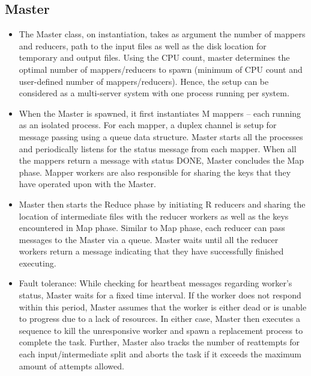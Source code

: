 \documentclass[a4paper,12pt]{article}
\begin{document}
\subsection{Master}

\begin{itemize}
    \item The Master class, on instantiation, takes as argument the number of mappers and reducers, path to the input files as well as the disk location for temporary and output files. Using the CPU count, master determines the optimal number of mappers/reducers to spawn (minimum of CPU count and user-defined number of mappers/reducers). Hence, the setup can be considered as a multi-server system with one process running per system.
    \item When the Master is spawned, it first instantiates M mappers -- each running as an isolated process. For each mapper, a duplex channel is setup for message passing using a queue data structure. Master starts all the processes and periodically listens for the status message from each mapper. When all the mappers return a message with status DONE, Master concludes the Map phase. Mapper workers are also responsible for sharing the keys that they have operated upon with the Master.
    \item Master then starts the Reduce phase by initiating R reducers and sharing the location of intermediate files with the reducer workers as well as the keys encountered in Map phase. Similar to Map phase, each reducer can pass messages to the Master via a queue. Master waits until all the reducer workers return a message indicating that they have successfully finished executing. 
    \item Fault tolerance: While checking for heartbeat messages regarding worker's status, Master waits for a fixed time interval. If the worker does not respond within this period, Master assumes that the worker is either dead or is unable to progress due to a lack of resources. In either case, Master then executes a sequence to kill the unresponsive worker and spawn a replacement process to complete the task. Further, Master also tracks the number of reattempts for each input/intermediate split and aborts the task if it exceeds the maximum amount of attempts allowed.
    
\end{itemize}
\end{document}
